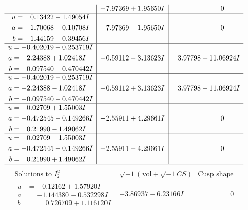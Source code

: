 \documentclass[1p]{elsarticle_modified}
\theoremstyle{definition}
\newcommand{\I}{\sqrt{-1}}
\begin{document}
$$\begin{array}{c|c|c}
 & -7.97369 + 1.95650 I & \phantom{-0.000000 } 0 \\ \hline\begin{aligned}
u &= \phantom{-}0.13422 - 1.49054 I \\
a &= -1.70068 + 0.10708 I \\
b &= \phantom{-}1.44159 + 0.39456 I\end{aligned}
 & -7.97369 - 1.95650 I & \phantom{-0.000000 } 0 \\ \hline\begin{aligned}
u &= -0.402019 + 0.253719 I \\
a &= -2.24388 + 1.02418 I \\
b &= -0.097540 + 0.470442 I\end{aligned}
 & -0.59112 - 3.13623 I & \phantom{-}3.97798 + 11.06924 I \\ \hline\begin{aligned}
u &= -0.402019 - 0.253719 I \\
a &= -2.24388 - 1.02418 I \\
b &= -0.097540 - 0.470442 I\end{aligned}
 & -0.59112 + 3.13623 I & \phantom{-}3.97798 - 11.06924 I \\ \hline\begin{aligned}
u &= -0.02709 + 1.55003 I \\
a &= -0.472545 - 0.149266 I \\
b &= \phantom{-}0.21990 - 1.49062 I\end{aligned}
 & -2.55911 + 4.29661 I & \phantom{-0.000000 } 0 \\ \hline\begin{aligned}
u &= -0.02709 - 1.55003 I \\
a &= -0.472545 + 0.149266 I \\
b &= \phantom{-}0.21990 + 1.49062 I\end{aligned}
 & -2.55911 - 4.29661 I & \phantom{-0.000000 } 0\\
 \hline 
 \end{array}$$\newpage$$\begin{array}{c|c|c}  
\text{Solutions to }I^u_{2}& \I (\text{vol} + \sqrt{-1}CS) & \text{Cusp shape}\\
 \hline 
\begin{aligned}
u &= -0.12162 + 1.57920 I \\
a &= -1.144380 - 0.532298 I \\
b &= \phantom{-}0.726709 + 1.116120 I\end{aligned}
 & -3.86937 - 6.23166 I & \phantom{-0.000000 } 0 \\ \hline\begin{aligned}

\end{aligned}
\end{array}$$
\end{document}
